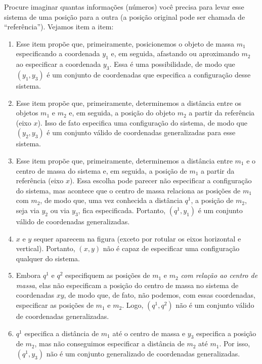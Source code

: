 \begin{question}
    \begin{solution}
      Procure imaginar quantas informações (números) você precisa para levar esse sistema de uma posição para a outra (a posição original pode ser chamada de ``referência'').
      Vejamos item a item:
      \begin{enumerate}
        \item Esse item propõe que, primeiramente, posicionemos o objeto de massa $m_1$ especificando a coordenada $y_1$ e, em seguida, afastando ou aproximando $m_2$ ao especificar a coordenada $y_3$.
        Essa é uma possibilidade, de modo que $(y_1,y_3)$ é um conjunto de coordenadas que especifica a configuração desse sistema.
        \item Esse item propõe que, primeiramente, determinemos a distância entre os objetos $m_1$ e $m_2$ e, em seguida, a posição do objeto $m_2$ a partir da referência (eixo $x$).
        Isso de fato especifica uma configuração do sistema, de modo que $(y_2, y_3)$ é um conjunto válido de coordenadas generalizadas para esse sistema.
        \item Esse item propõe que, primeiramente, determinemos a distância entre $m_1$ e o centro de massa do sistema e, em seguida, a posição de $m_1$ a partir da referência (eixo $x$).
        Essa escolha pode parecer não especificar a configuração do sistema, mas acontece que o centro de massa relaciona as posições de $m_1$ com $m_2$, de modo que, uma vez conhecida a distância $q^1$, a posição de $m_2$, seja via $y_2$ ou via $y_3$, fica especificada.
        Portanto, $(q^1, y_1)$ é um conjunto válido de coordenadas generalizadas.
        \item $x$ e $y$ sequer aparecem na figura (exceto por rotular os eixos horizontal e vertical).
        Portanto, $(x,y)$ não é capaz de especificar uma configuração qualquer do sistema.
        \item Embora $q^1$ e $q^2$ especifiquem as posições de $m_1$ e $m_2$ \emph{com relação ao centro de massa}, elas não especificam a posição do centro de massa no sistema de coordenadas $xy$, de modo que, de fato, não podemos, com essas coordenadas, especificar as posições de $m_1$ e $m_2$.
        Logo, $(q^1, q^2)$ não é um conjunto válido de coordenadas generalizadas.
        \item $q^1$ especifica a distância de $m_1$ até o centro de massa e $y_3$ especifica a posição de $m_2$, mas não conseguimos especificar a distância de $m_2$ até $m_1$.
        Por isso, $(q^1, y_3)$ não é um conjunto generalizado de coordenadas generalizadas.
      \end{enumerate}
    \end{solution}
\end{question}